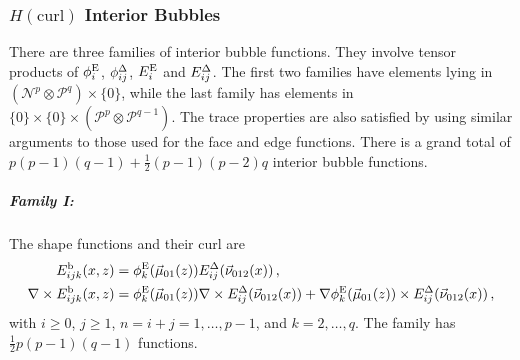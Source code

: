 %
%

\subsubsection{\texorpdfstring{$H(\mathrm{curl})$}{Hcurl} Interior Bubbles}

There are three families of interior bubble functions.
They involve tensor products of $\phi_i^{\mathrm{E}}$, $\phi_{ij}^\Delta$, $E_i^{\mathrm{E}}$ and  $E_{ij}^\Delta$.
The first two families have elements lying in $(\mathcal{N}^p\otimes\mathcal{P}^q)\times\{0\}$, while the last family has elements in $\{0\}\times\{0\}\times(\mathcal{P}^p\otimes\mathcal{P}^{q-1})$.
The trace properties are also satisfied by using similar arguments to those used for the face and edge functions. 
There is a grand total of $p(p-1)(q-1)+\frac{1}{2}(p-1)(p-2)q$ interior bubble functions.



\subparagraph{Family I:}
The shape functions and their curl are
\begin{equation}
	\begin{aligned}	
		E_{ijk}^\mathrm{b}(x,z)&=\phi_k^{\mathrm{E}}(\vec{\mu}_{01}(z))E_{ij}^\Delta(\vec{\nu}_{012}(x))\,,\\
		\nabla\times E_{ijk}^\mathrm{b}(x,z)&=\phi_k^{\mathrm{E}}(\vec{\mu}_{01}(z))\nabla\times E_{ij}^\Delta(\vec{\nu}_{012}(x))
			+\nabla\phi_k^{\mathrm{E}}(\vec{\mu}_{01}(z))\times E_{ij}^\Delta(\vec{\nu}_{012}(x))\,,
	\end{aligned}
\end{equation}
with $i\geq0$, $j\geq1$, $n=i+j=1,\ldots,p-1$, and $k=2,\ldots,q$. 
The family has $\frac{1}{2}p(p-1)(q-1)$ functions.

